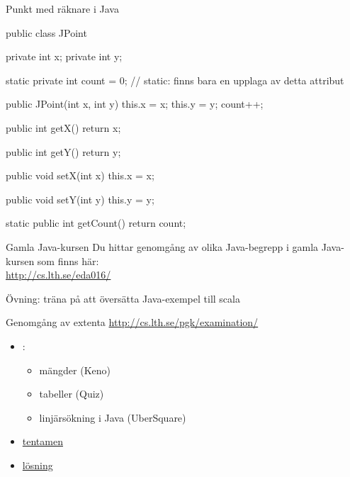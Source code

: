 \begin{Slide}{Punkt med räknare i Java}

\begin{Code}[language=Java,basicstyle=\ttfamily\SlideFontSize{5.2}{6}]
public class JPoint {
    private int x;
    private int y;

    static private int count = 0;  // static: finns bara en upplaga av detta attribut

    public JPoint(int x, int y){
        this.x = x;
        this.y = y;
        count++;
    }

    public int getX(){
        return x;
    }

    public int getY(){
        return y;
    }

    public void setX(int x){
        this.x = x;
    }

    public void setY(int y){
        this.y = y;
    }

    static public int getCount(){
       return count;
    }
}
\end{Code}


\end{Slide}

\begin{Slide}{Gamla Java-kursen}
Du hittar genomgång av olika Java-begrepp i gamla Java-kursen som finns här: \\\vspace{1em}
\url{http://cs.lth.se/eda016/}
\\\vspace{2em}

Övning: träna på att översätta Java-exempel till scala

\end{Slide}




\begin{Slide}{Genomgång av extenta}
\url{http://cs.lth.se/pgk/examination/}

\vspace{1em}
\begin{itemize}
\item {}:
\begin{itemize}
  \item mängder (Keno)
  \item tabeller (Quiz)
  \item linjärsökning i Java (UberSquare)
\end{itemize}
\item \href{http://fileadmin.cs.lth.se/pgk/EDAA45-exam-2017aug23.pdf}{tentamen}
\item \href{http://fileadmin.cs.lth.se/pgk/EDAA45-exam-2017aug23-solution.pdf}{lösning}
\end{itemize}
\end{Slide}

